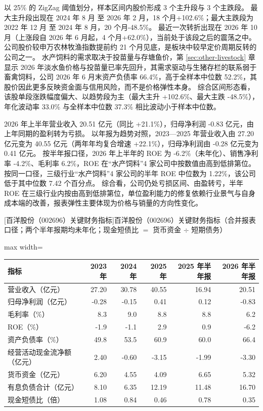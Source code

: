  以 25\% 的 ZigZag 阈值划分，样本区间内股价形成 3 个主升段与 3 个主跌段。 最大主升段出现在 2024 年 8 月 至 2026 年 2 月，18 个月+102.6\%；最大主跌段为 2022 年 12 月 至 2024 年 8 月，20 个月-48.5\%。 最近一次转折出现在 2026 年 10 月（上涨段自 2026 年 6 月起，4 个月+62.0\%），当前处于该段之后的震荡之中。 公司股价较申万农林牧渔指数提前约 21 个月见底，是板块中较早定价周期反转的公司之一。 水产饲料的需求取决于投苗量与存塘鱼价，第 \ref{sec:other-livestock} 章显示 2026 年淡水鱼价格与投苗量已率先回升，其需求驱动与生猪存栏的联系弱于畜禽饲料，公司 2026 年 6 月末资产负债率 66.4\%，高于全样本中位数 52.2\%，其股价因此更多反映资金面与信用风险，而不是价格弹性本身。 综合区间形态看，该股单段涨跌幅度偏大、以趋势段为主（最大主升 +102.6\%、最大主跌 -48.5\%），年化波动率 33.0\% 与全样本中位数 37.3\% 相比波动小于样本中位数。

 2026 年上半年营业收入 20.51 亿元（同比 +21.1\%），归母净利润 -0.83 亿元，由上年同期的盈利转为亏损。 以年报为趋势对照，2023---2025 年营业收入由 27.20 亿元变为 40.55 亿元（两年年均复合增速 +22.1\%），归母净利润由 -0.28 亿元变为 0.41 亿元。 按半年报口径，2026 年上半年的 ROE 为 -6.2\%（未年化）、销售净利率 -4.2\%、毛利率 6.2\%，ROE 在“水产饲料”4 家公司中按数值由高到低排第位。 按同一口径，三级行业“水产饲料”4 家公司的半年 ROE 中位数为 1.22\%，该公司低于其中位数 7.42 个百分点。 综合看，公司仍处亏损区间、由盈转亏，半年 ROE 在三级行业内按由高到低排第位，单位盈利能力的修复依赖行业景气与自身成本端的改善，报表弹性主要体现为价格与销量的方向性变化。

\begin{center}\small\setlength{\tabcolsep}{3.4pt}
[百洋股份（002696）关键财务指标]{百洋股份（002696）关键财务指标（合并报表口径；两个半年报期均未年化；现金短债比 $=$ 货币资金 $\div$ 短期债务）}
\begin{adjustbox}{max width=\textwidth}
\begin{tabular}{@{}lrrrrr@{}}
\toprule
指标 & 2023 年 & 2024 年 & 2025 年 & 2025 年半年报 & 2026 年半年报 \\
\midrule
营业收入（亿元） & 27.20 & 30.78 & 40.55 & 16.94 & 20.51 \\
归母净利润（亿元） & -0.28 & -0.15 & 0.41 & 0.12 & -0.83 \\
毛利率（\%） & 8.3 & 9.0 & 8.8 & 8.8 & 6.2 \\
ROE（\%） & -1.9 & -1.1 & 2.9 & 0.9 & -6.2 \\
资产负债率（\%） & 49.8 & 53.5 & 60.9 & 60.0 & 66.4 \\
经营活动现金流净额（亿元） & 2.40 & -0.60 & -3.15 & -1.99 & -3.30 \\
货币资金（亿元） & 6.20 & 4.55 & 4.09 & 6.65 & 5.32 \\
有息负债合计（亿元） & 8.10 & 6.35 & 12.19 & 11.48 & 16.70 \\
现金短债比（倍） & 1.08 & 0.84 & 0.46 & 0.78 & 0.35 \\
\bottomrule
\end{tabular}
\end{adjustbox}
\end{center}

